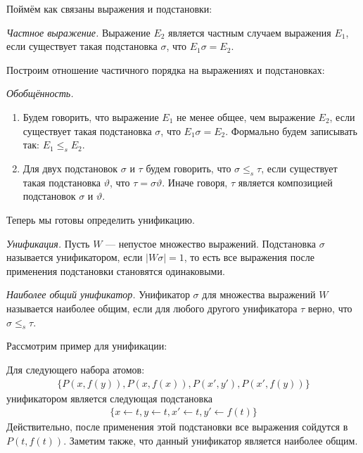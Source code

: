 Поймём как связаны выражения и подстановки:
\begin{definition}
\emph{Частное выражение.} Выражение $E_2$ является частным случаем выражения $E_1$, если существует такая подстановка $\sigma$, что $E_1\sigma = E_2$.
\end{definition}

Построим отношение частичного порядка на выражениях и подстановках:
\begin{definition}
\emph{Обобщённость.}
  \begin{enumerate}
	\item Будем говорить, что выражение $E_1$ не менее общее, чем выражение $E_2$, если существует такая подстановка $\sigma$, что $E_1\sigma = E_2$. Формально будем записывать так: $E_1 \leq_s E_2$.
    \item Для двух подстановок $\sigma$ и $\tau$ будем говорить, что $\sigma \leq_s \tau$, если существует такая подстановка $\vartheta$, что $\tau = \sigma\vartheta$. Иначе говоря, $\tau$ является композицией подстановок $\sigma$ и $\vartheta$.
  \end{enumerate}
\end{definition}

Теперь мы готовы определить унификацию.

\begin{definition}
\emph{Унификация.} Пусть $W$ --- непустое множество выражений. Подстановка $\sigma$ называется унификатором, если $|W\sigma| = 1$, то есть все выражения после применения подстановки становятся одинаковыми.
\end{definition}

\begin{definition}
\emph{Наиболее общий унификатор.} Унификатор $\sigma$ для множества выражений $W$ называется наиболее общим, если для любого другого унификатора $\tau$ верно, что $\sigma \leq_s \tau$.
\end{definition}

Рассмотрим пример для унификации:
\begin{example}
Для следующего набора атомов:
\begin{gather*}
\{ P(x, f(y)), P(x, f(x)), P(x',y'), P(x', f(y)) \}
\end{gather*}
унификатором является следующая подстановка
\begin{gather*}
\{ x \leftarrow t, y \leftarrow t, x' \leftarrow t, y' \leftarrow f(t) \}
\end{gather*}
Действительно, после применения этой подстановки все выражения сойдутся в $P(t, f(t))$. Заметим также, что данный унификатор является наиболее общим.
\end{example}


